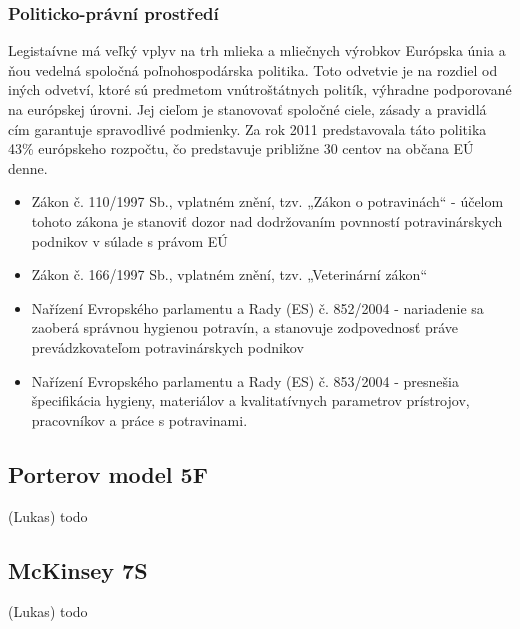 \documentclass[12pt]{article}%
\begin{document}
\subsubsection*{Politicko-právní prostředí}
Legistaívne má veľký vplyv na trh mlieka a mliečnych výrobkov Európska únia a ňou vedelná spoločná poľnohospodárska politika. Toto odvetvie je na rozdiel od iných odvetví, ktoré sú predmetom vnútroštátnych politík, výhradne podporované na európskej úrovni. Jej cieľom je stanovovať spoločné ciele, zásady a pravidlá cím garantuje spravodlivé podmienky. Za rok 2011 predstavovala táto politika 43\% európskeho rozpočtu, čo predstavuje približne 30 centov na občana EÚ denne.%
\begin{itemize}
	\item Zákon č. 110/1997 Sb., vplatném znění, tzv. „Zákon o potravinách“ - účelom tohoto zákona je stanoviť dozor nad dodržovaním povnností potravinárskych podnikov v súlade s právom EÚ %
	\item Zákon č. 166/1997 Sb., vplatném znění, tzv. „Veterinární zákon“ %
	\item Nařízení Evropského parlamentu a Rady (ES) č. 852/2004 - nariadenie sa zaoberá správnou hygienou potravín, a stanovuje zodpovednosť práve prevádzkovateľom potravinárskych podnikov %
	\item Nařízení Evropského parlamentu a Rady (ES) č. 853/2004 - presnešia špecifikácia hygieny, materiálov a kvalitatívnych parametrov prístrojov, pracovníkov a práce s potravinami. %
\end{itemize}

\subsection{Porterov model 5F} (Lukas)
todo

\subsection{McKinsey 7S} (Lukas)
todo
\end{document}
